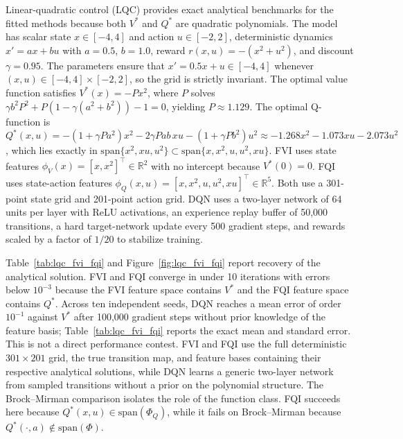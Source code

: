 Linear-quadratic control (LQC) provides exact analytical benchmarks for the fitted methods because both $V^*$ and $Q^*$ are quadratic polynomials. The model has scalar state $x \in [-4, 4]$ and action $u \in [-2, 2]$, deterministic dynamics $x' = ax + bu$ with $a = 0.5$, $b = 1.0$, reward $r(x,u) = -(x^2 + u^2)$, and discount $\gamma = 0.95$. The parameters ensure that $x' = 0.5x + u \in [-4, 4]$ whenever $(x, u) \in [-4,4] \times [-2,2]$, so the grid is strictly invariant. The optimal value function satisfies $V^*(x) = -Px^2$, where $P$ solves $\gamma b^2 P^2 + P(1 - \gamma(a^2 + b^2)) - 1 = 0$, yielding $P \approx 1.129$. The optimal Q-function is $Q^*(x,u) = -(1+\gamma Pa^2)x^2 - 2\gamma Pab\,xu - (1+\gamma Pb^2)u^2 \approx -1.268x^2 - 1.073xu - 2.073u^2$, which lies exactly in $\mathrm{span}\{x^2, xu, u^2\} \subset \mathrm{span}\{x, x^2, u, u^2, xu\}$. FVI uses state features $\phi_V(x) = [x, x^2]^\top \in \mathbb{R}^2$ with no intercept because $V^*(0) = 0$. FQI uses state-action features $\phi_Q(x,u) = [x, x^2, u, u^2, xu]^\top \in \mathbb{R}^5$. Both use a 301-point state grid and 201-point action grid. DQN uses a two-layer network of 64 units per layer with ReLU activations, an experience replay buffer of 50,000 transitions, a hard target-network update every 500 gradient steps, and rewards scaled by a factor of $1/20$ to stabilize training.

Table~\ref{tab:lqc_fvi_fqi} and Figure~\ref{fig:lqc_fvi_fqi} report recovery of the analytical solution. FVI and FQI converge in under 10 iterations with errors below $10^{-3}$ because the FVI feature space contains $V^*$ and the FQI feature space contains $Q^*$. Across ten independent seeds, DQN reaches a mean error of order $10^{-1}$ against $V^*$ after 100,000 gradient steps without prior knowledge of the feature basis; Table~\ref{tab:lqc_fvi_fqi} reports the exact mean and standard error. This is not a direct performance contest. FVI and FQI use the full deterministic $301 \times 201$ grid, the true transition map, and feature bases containing their respective analytical solutions, while DQN learns a generic two-layer network from sampled transitions without a prior on the polynomial structure. The Brock--Mirman comparison isolates the role of the function class. FQI succeeds here because $Q^*(x,u) \in \mathrm{span}(\Phi_Q)$, while it fails on Brock--Mirman because $Q^*(\cdot,a) \notin \mathrm{span}(\Phi)$.

\begin{table}[h]
\centering
\small

\caption{Fitted weights and convergence metrics for FVI, FQI, and DQN on linear-quadratic control. The FVI $x^2$ coefficient recovers the Riccati solution $P \approx 1.129$. The FQI quadratic coefficients match the analytical $Q^*$ to four decimal places. FVI and FQI achieve max error below $10^{-3}$ against the analytical $V^*$; the DQN row reports mean $\pm$ standard error across ten independent seeds after 100,000 gradient steps with no feature basis specified. FVI and FQI exercise the full deterministic grid with the true transition kernel, so seed-to-seed variation is exactly zero and no standard error is reported for them.}
\label{tab:lqc_fvi_fqi}
\end{table}


